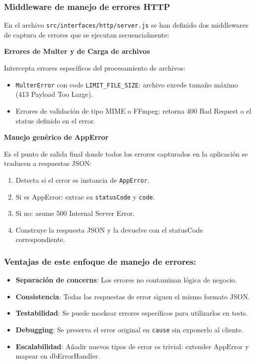 \subsubsection*{Middleware de manejo de errores HTTP}

En el archivo \texttt{src/interfaces/http/server.js} se han definido dos middlewares de captura de errores 
que se ejecutan secuencialmente:

\textbf{Errores de Multer y de Carga de archivos}

Intercepta errores específicos del procesamiento de archivos:

\begin{itemize}
  \item \texttt{MulterError} con code \texttt{LIMIT\_FILE\_SIZE}: archivo excede tamaño máximo (413 Payload Too Large).
  \item Errores de validación de tipo MIME o FFmpeg: retorna 400 Bad Request o el status definido en el error.
\end{itemize}

\textbf{Manejo genérico de AppError}

Es el punto de salida final donde todos los errores capturados en la aplicación se traducen a respuestas JSON:

\begin{enumerate}
  \item Detecta si el error es instancia de \texttt{AppError}.
  \item Si es AppError: extrae su \texttt{statusCode} y \texttt{code}.
  \item Si no: asume 500 Internal Server Error.
  \item Construye la respuesta JSON y la devuelve con el statusCode correspondiente.
\end{enumerate}


\subsubsection*{Ventajas de este enfoque de manejo de errores:}

\begin{itemize}
  \item \textbf{Separación de concerns}: Los errores no contaminan lógica de negocio.
  \item \textbf{Consistencia}: Todas las respuestas de error siguen el mismo formato JSON.
  \item \textbf{Testabilidad}: Se puede mockear errores específicos para utilizarlos en tests.
  \item \textbf{Debugging}: Se preserva el error original en \texttt{cause} sin exponerlo al cliente.
  \item \textbf{Escalabilidad}: Añadir nuevos tipos de error es trivial: extender AppError y mapear en dbErrorHandler.
\end{itemize}

